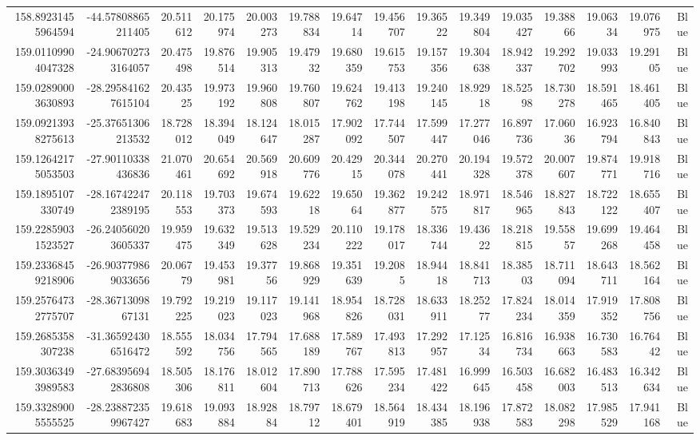 \begin{center}
\begin{longtable}{rrrrrrrrrrrrrrr}
158.89231455964594 & -44.57808865211405 & 20.511612 & 20.175974 & 20.003273 & 19.788834 & 19.64714 & 19.456707 & 19.36522 & 19.349804 & 19.035427 & 19.38866 & 19.06334 & 19.076975 & Blue \\
159.01109904047328 & -24.906702733164057 & 20.475498 & 19.876514 & 19.905313 & 19.47932 & 19.680359 & 19.615753 & 19.157356 & 19.304638 & 18.942337 & 19.292702 & 19.033993 & 19.29105 & Blue \\
159.02890003630893 & -28.295841627615104 & 20.43525 & 19.973192 & 19.960808 & 19.760807 & 19.624762 & 19.413198 & 19.240145 & 18.92918 & 18.52598 & 18.730278 & 18.591465 & 18.461405 & Blue \\
159.09213938275613 & -25.37651306213532 & 18.728012 & 18.394049 & 18.124647 & 18.015287 & 17.902092 & 17.744507 & 17.599447 & 17.277046 & 16.897736 & 17.06036 & 16.923794 & 16.840843 & Blue \\
159.12642175053503 & -27.90110338436836 & 21.070461 & 20.654692 & 20.569918 & 20.609776 & 20.42915 & 20.344078 & 20.270441 & 20.194328 & 19.572378 & 20.007607 & 19.874771 & 19.918716 & Blue \\
159.1895107330749 & -28.167422472389195 & 20.118553 & 19.703373 & 19.674593 & 19.62218 & 19.65064 & 19.362877 & 19.242575 & 18.971817 & 18.546965 & 18.827843 & 18.722122 & 18.655407 & Blue \\
159.22859031523527 & -26.240560203605337 & 19.959475 & 19.632349 & 19.513628 & 19.529234 & 20.110222 & 19.178017 & 18.336744 & 19.43622 & 18.218815 & 19.55857 & 19.699268 & 19.464458 & Blue \\
159.23368459218906 & -26.903779869033656 & 20.06779 & 19.453981 & 19.37756 & 19.868929 & 19.351639 & 19.2085 & 18.94418 & 18.841713 & 18.38503 & 18.711094 & 18.643711 & 18.562164 & Blue \\
159.25764732775707 & -28.3671309867131 & 19.792225 & 19.219023 & 19.117023 & 19.141968 & 18.954826 & 18.728031 & 18.633911 & 18.25277 & 17.824234 & 18.014359 & 17.919352 & 17.808756 & Blue \\
159.2685358307238 & -31.365924306516472 & 18.555592 & 18.034756 & 17.794565 & 17.688189 & 17.589767 & 17.493813 & 17.292957 & 17.12534 & 16.816734 & 16.938663 & 16.730583 & 16.76442 & Blue \\
159.30363493989583 & -27.683956942836808 & 18.505306 & 18.176811 & 18.012604 & 17.890713 & 17.788626 & 17.595234 & 17.481422 & 16.999645 & 16.503458 & 16.682003 & 16.483513 & 16.342634 & Blue \\
159.33289005555525 & -28.238872359967427 & 19.618683 & 19.093884 & 18.92884 & 18.79712 & 18.679401 & 18.564919 & 18.434385 & 18.196938 & 17.872583 & 18.082298 & 17.985529 & 17.941168 & Blue \\

\end{longtable}
\end{center}
